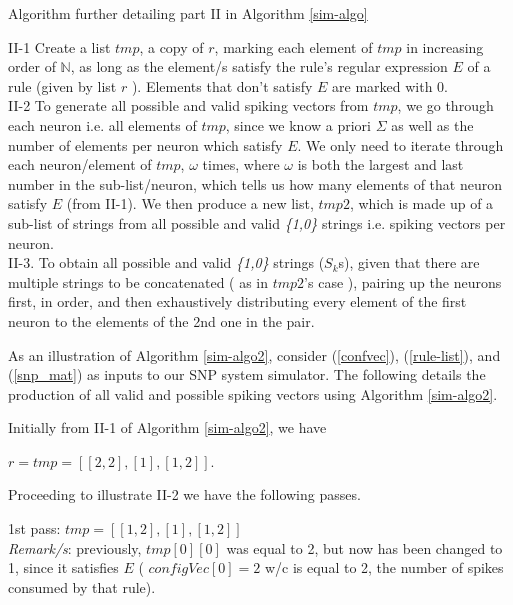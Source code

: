 \documentclass{acm_proc_article-sp}
\begin{document}
\begin{algorithm}
\caption{Algorithm further detailing part II in Algorithm \ref{sim-algo}}
\label{sim-algo2}
\begin{algorithmic}
II-1 Create a list $tmp$, a copy of $r$, marking
each element of $tmp$ in increasing order of $\mathbb N$,
as long as the element/s satisfy the rule's 
regular expression $E$ of a rule (given by list
$r$ ). Elements that don't satisfy $E$ are marked
 with 0.\\
 
II-2 To generate all possible and valid spiking vectors from
$tmp$, we go through each neuron i.e. all elements of $tmp$,
since we know a priori $\Sigma$ as well as the number of
elements per neuron which satisfy $E$. We only need to iterate
through each neuron/element of $tmp$, $\omega$ times, where $\omega$ is
both the largest and last number in the sub-list/neuron,
which tells us how many elements of that neuron satisfy $E$
(from II-1). We then produce a new list, $tmp2$, which is
made up of a sub-list of strings from all possible and valid
\textit{\{1,0\}} strings i.e. spiking vectors per neuron.\\

II-3. To obtain all possible and valid \textit{\{1,0\}}
strings ($S_k$s), given that there are multiple strings
to be concatenated ( as in $tmp2$'s case ), pairing up the
neurons first, in order, and then exhaustively distributing
every element of the first neuron to the elements of the 2nd
one in the pair. 

\end{algorithmic}
\end{algorithm}

As an illustration of Algorithm \ref{sim-algo2}, consider (\ref{confvec}), (\ref{rule-list}), and (\ref{snp_mat}) as inputs to our SNP system simulator. The following details the production of all valid and possible spiking vectors using Algorithm \ref{sim-algo2}.

Initially from II-1 of Algorithm \ref{sim-algo2}, we have

$r = tmp = [ [ 2, 2 ], [ 1 ], [ 1, 2 ] ]$.

Proceeding to illustrate II-2 we have the following passes.

1st pass:
$tmp = [ [ 1, 2 ], [ 1 ], [ 1, 2 ] ]$\\
\textit{Remark/s}: previously, $tmp [ 0 ][ 0 ]$ was equal to 2,
but now has been changed to 1, since it satisfies $E$
( $configVec[ 0 ] = 2$ w/c is equal to 2, the
number of spikes consumed by that rule).
\end{document}
